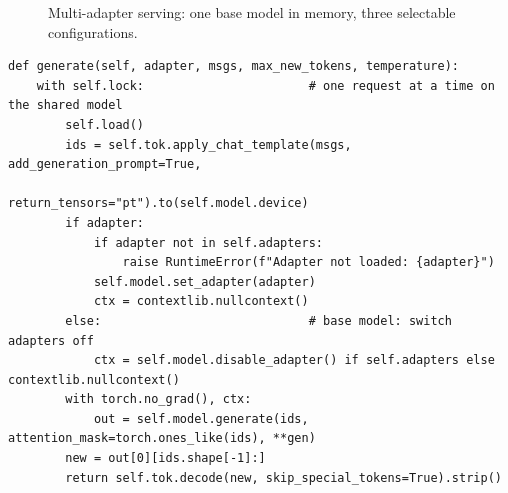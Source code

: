 \documentclass[11pt,a4paper]{article}
\newcommand{\code}[1]{\texttt{#1}}
\begin{document}
\begin{figure}[H]
\centering
{}
\caption{Multi-adapter serving: one base model in memory, three selectable configurations.}
\label{fig:adapters}
\end{figure}

\par\noindent\begin{minipage}{\linewidth}\begin{lstlisting}[caption={Switching adapters per request (\code{agent/llm/hf\_provider.py}, shortened).},label={lst:adapters}]
def generate(self, adapter, msgs, max_new_tokens, temperature):
    with self.lock:                       # one request at a time on the shared model
        self.load()
        ids = self.tok.apply_chat_template(msgs, add_generation_prompt=True,
                                           return_tensors="pt").to(self.model.device)
        if adapter:
            if adapter not in self.adapters:
                raise RuntimeError(f"Adapter not loaded: {adapter}")
            self.model.set_adapter(adapter)
            ctx = contextlib.nullcontext()
        else:                             # base model: switch adapters off
            ctx = self.model.disable_adapter() if self.adapters else contextlib.nullcontext()
        with torch.no_grad(), ctx:
            out = self.model.generate(ids, attention_mask=torch.ones_like(ids), **gen)
        new = out[0][ids.shape[-1]:]
        return self.tok.decode(new, skip_special_tokens=True).strip()
\end{lstlisting}\end{minipage}\par
\end{document}
